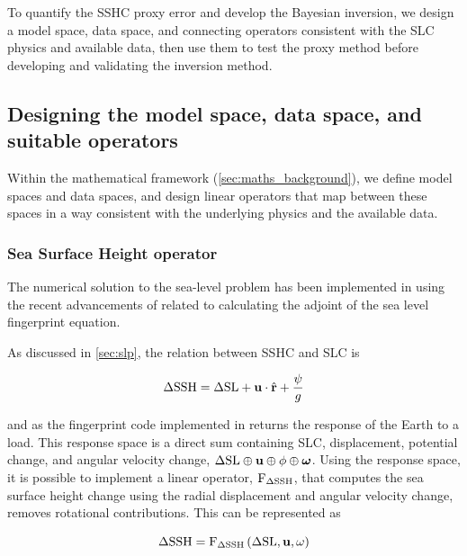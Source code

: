 To quantify the SSHC proxy error and develop the Bayesian inversion, we design a model space, data space, and connecting operators consistent with the SLC physics and available data, then use them to test the proxy method before developing and validating the inversion method.

\subsection{Designing the model space, data space, and suitable operators}

Within the mathematical framework (\autoref{sec:maths_background}), we define model spaces and data spaces, and design linear operators that map between these spaces in a way consistent with the underlying physics and the available data.

\subsubsection{Sea Surface Height operator}



The numerical solution to the sea-level problem has been implemented in  using the recent advancements of \textcite{al-attarReciprocitySensitivityKernels2023} related to calculating the adjoint of the sea level fingerprint equation.

As discussed in \autoref{sec:slp}, the relation between SSHC and SLC is

\begin{equation}
  \Delta \mathrm{SSH} = \Delta \mathrm{SL} + \mathbf{u} \cdot \hat{\mathbf{r}} + \frac{\psi}{g} \label{eq:slc_ssh_eq}
\end{equation}

and as the fingerprint code implemented in  returns the response of the Earth to a load. This response space is a direct sum containing SLC, displacement, potential change, and angular velocity change, $\Delta \mathrm{SL} \oplus \mathbf{u} \oplus \phi \oplus \boldsymbol{\omega}$. Using the response space, it is possible to implement a linear operator, $\operatorname{{F}}_{{\Delta \mathrm{SSH}}}$, that computes the sea surface height change using the radial displacement and angular velocity change, removes rotational contributions. This can be represented as

\begin{equation}
    \Delta \mathrm{SSH} = \operatorname{{F}}_{{\Delta \mathrm{SSH}}}\left(\Delta \mathrm{SL}, \mathbf{u}, \omega\right)
\end{equation}

